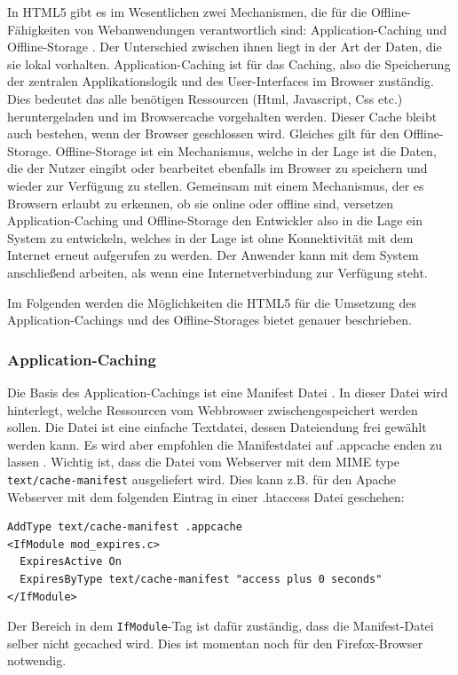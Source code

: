 In HTML5 gibt es im Wesentlichen zwei Mechanismen, die für die Offline-Fähigkeiten von Webanwendungen verantwortlich sind: Application-Caching und Offline-Storage \cite{html5_rocks_offline_what_does_it_mean}. Der Unterschied zwischen ihnen liegt in der Art der Daten, die sie lokal vorhalten. Application-Caching ist für das Caching, also die Speicherung der zentralen Applikationslogik und des User-Interfaces im Browser zuständig. Dies bedeutet das alle benötigen Ressourcen (Html, Javascript, Css etc.) heruntergeladen und im Browsercache vorgehalten werden. Dieser Cache bleibt auch bestehen, wenn der Browser geschlossen wird. Gleiches gilt für den Offline-Storage. Offline-Storage ist ein Mechanismus, welche in der Lage ist die Daten, die der Nutzer eingibt oder bearbeitet ebenfalls im Browser zu speichern und wieder zur Verfügung zu stellen. Gemeinsam mit einem Mechanismus, der es Browsern erlaubt zu erkennen, ob sie online oder offline sind, versetzen Application-Caching und Offline-Storage den Entwickler also in die Lage ein System zu entwickeln, welches in der Lage ist ohne Konnektivität mit dem Internet erneut aufgerufen zu werden. Der Anwender kann mit dem System anschließend arbeiten, als wenn eine Internetverbindung zur Verfügung steht.

Im Folgenden werden die Möglichkeiten die HTML5 für die Umsetzung des Application-Cachings und des Offline-Storages bietet genauer beschrieben.

\subsubsection{Application-Caching}\label{section:appcache}
Die Basis des Application-Cachings ist eine Manifest Datei \cite{html5_rocks_appcache_leitfaden}. In dieser Datei wird hinterlegt, welche Ressourcen vom Webbrowser zwischengespeichert werden sollen. Die Datei ist eine einfache Textdatei, dessen Dateiendung frei gewählt werden kann. Es wird aber empfohlen die Manifestdatei auf .appcache enden zu lassen \cite{w3c_offline_appcache}. Wichtig ist, dass die Datei vom Webserver mit dem MIME type \texttt{text/cache-manifest} ausgeliefert wird. Dies kann z.B. für den  Apache Webserver mit dem folgenden Eintrag in einer .htaccess Datei geschehen: 
\begin{lstlisting}
AddType text/cache-manifest .appcache
<IfModule mod_expires.c>
  ExpiresActive On
  ExpiresByType text/cache-manifest "access plus 0 seconds"
</IfModule>
\end{lstlisting}
Der Bereich in dem \texttt{IfModule}-Tag ist dafür zuständig, dass die Manifest-Datei selber nicht gecached wird. Dies ist momentan noch für den Firefox-Browser notwendig.

